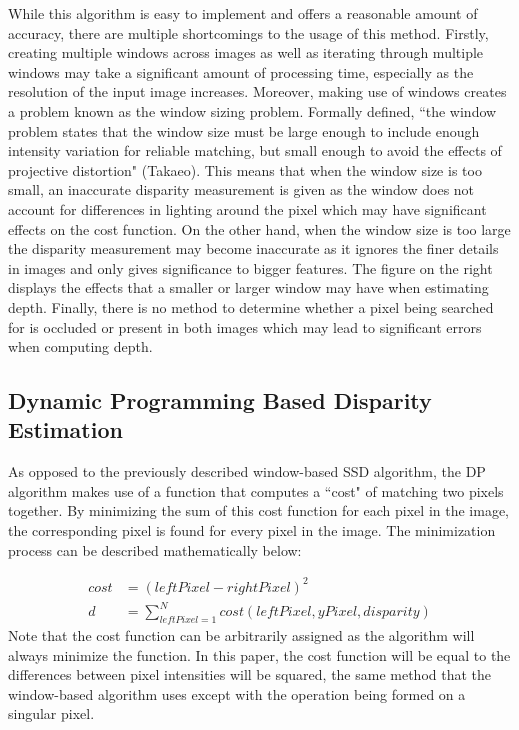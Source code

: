 \documentclass[11pt]{scrartcl}
\begin{document}
While this algorithm is easy to implement and offers a reasonable amount of accuracy, there are multiple shortcomings to the usage of this method. Firstly, creating multiple windows across images as well as iterating through multiple windows may take a significant amount of processing time, especially as the resolution of the input image increases. Moreover, making use of windows creates a problem 
known as the window sizing problem. Formally defined, ``the window problem states that the window size must be large enough to include enough intensity variation for reliable matching, but small enough to avoid the effects of projective distortion" (Takaeo). This means that when the 
window size is too small, an inaccurate disparity measurement is given as the window does not account for differences in lighting around the pixel which may have significant effects on the cost function. On the other hand, when the window size is too large the disparity measurement may become inaccurate as it ignores the finer details in images and only gives significance to bigger features. The figure on the right displays the 
effects that a smaller or larger window may have when estimating depth. Finally, there is no method to determine whether a pixel being searched for is occluded or present in both images which may lead to significant errors when computing depth. 

\subsection{Dynamic Programming Based Disparity Estimation}
As opposed to the previously described window-based SSD algorithm, the DP algorithm makes use of a function that computes a ``cost" of matching two pixels together. By minimizing the sum of this cost function for each pixel in the image, the corresponding pixel is found for every pixel in the image. The minimization process can be described mathematically below:

\begin{theorem}
    \begin{align}
        cost & =  (leftPixel - rightPixel)^2 \\
        d & = \displaystyle\sum_{leftPixel=1}^{N} cost(leftPixel,yPixel,disparity)
    \end{align}
    Note that the cost function can be arbitrarily assigned as the algorithm will always minimize the function. In this paper, the cost function will be equal to the differences between pixel intensities will be squared, the same method that the window-based algorithm uses except with the operation being formed on a singular pixel. 
\end{theorem}
\end{document}
